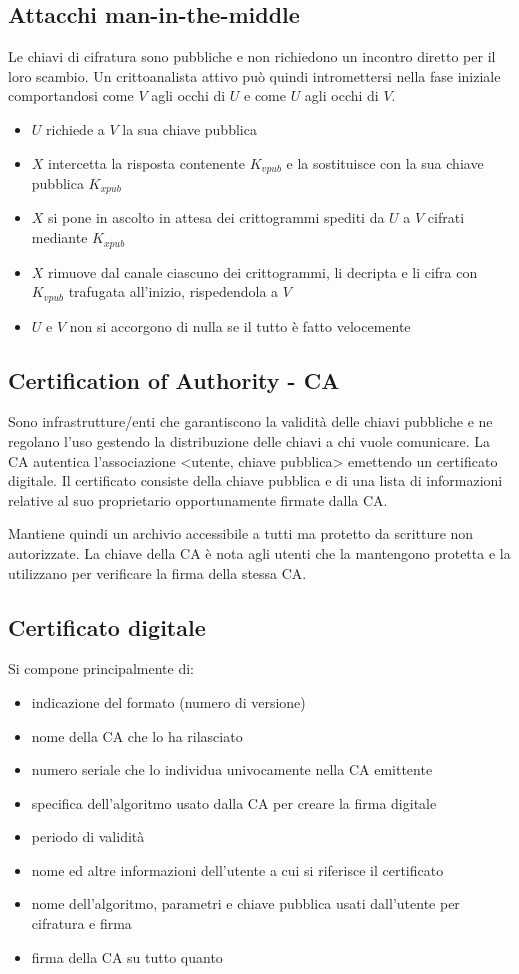 \subsection{Attacchi man-in-the-middle}
Le chiavi di cifratura sono pubbliche e non richiedono un incontro diretto per il loro scambio.
Un crittoanalista attivo può quindi intromettersi nella fase iniziale comportandosi come $V$ agli occhi di $U$ e come $U$ agli occhi di $V$.
\begin{itemize}
    \item $U$ richiede a $V$ la sua chiave pubblica
    \item $X$ intercetta la risposta contenente $K_{vpub}$ e la sostituisce con la sua chiave pubblica $K_{xpub}$
    \item $X$ si pone in ascolto in attesa dei crittogrammi spediti da $U$ a $V$ cifrati mediante $K_{xpub}$
    \item $X$ rimuove dal canale ciascuno dei crittogrammi, li decripta e li cifra con $K_{vpub}$ trafugata all'inizio, rispedendola a $V$
    \item $U$ e $V$ non si accorgono di nulla se il tutto è fatto velocemente
\end{itemize}

\subsection{Certification of Authority - CA}
Sono infrastrutture/enti che garantiscono la validità delle chiavi pubbliche e ne regolano l'uso gestendo la distribuzione delle chiavi a chi vuole comunicare.
La CA autentica l'associazione <utente, chiave pubblica> emettendo un certificato digitale.
Il certificato consiste della chiave pubblica e di una lista di informazioni relative al suo proprietario opportunamente firmate dalla CA.

Mantiene quindi un archivio accessibile a tutti ma protetto da scritture non autorizzate.
La chiave della CA è nota agli utenti che la mantengono protetta e la utilizzano per verificare la firma della stessa CA.

\subsection{Certificato digitale}
Si compone principalmente di:
\begin{itemize}
    \item indicazione del formato (numero di versione)
    \item nome della CA che lo ha rilasciato
    \item numero seriale che lo individua univocamente nella CA emittente
    \item specifica dell'algoritmo usato dalla CA per creare la firma digitale
    \item periodo di validità
    \item nome ed altre informazioni dell'utente a cui si riferisce il certificato
    \item nome dell'algoritmo, parametri e chiave pubblica usati dall'utente per cifratura e firma
    \item firma della CA su tutto quanto
\end{itemize}

